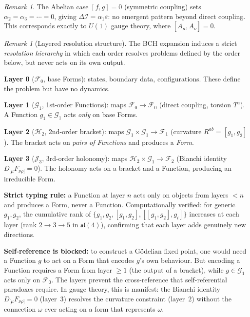 \documentclass[11pt,a4paper]{article}
\theoremstyle{plain}
\theoremstyle{definition}
\theoremstyle{remark}
\newtheorem{remark}[theorem]{Remark}
\newcommand{\DI}{\Delta\mathcal{I}}
\newcommand{\eps}{\varepsilon}
\begin{document}
\begin{remark}
The Abelian case $[f,g] = 0$ (symmetric coupling) sets $\alpha_2 = \alpha_3 = \cdots = 0$, 
giving $\DI = \alpha_1 \eps$: no emergent pattern beyond direct coupling.
This corresponds exactly to $U(1)$ gauge theory, where $[A_\mu, A_\nu] = 0$.
\end{remark}

\begin{remark}[Layered resolution structure]\label{rem:layers}
The BCH expansion induces a strict \emph{resolution hierarchy} in which each
order resolves problems defined by the order below, but never acts on its
own output.

\medskip
\noindent\textbf{Layer 0} ($\mathcal{F}_0$, base Forms): states, boundary
data, configurations.  These define the problem but have no dynamics.

\noindent\textbf{Layer 1} ($\mathcal{G}_1$, 1st-order Functions):
maps $\mathcal{F}_0 \to \mathcal{F}_0$ (direct coupling, torsion $T^a$).
A Function $g_1 \in \mathcal{G}_1$ acts \emph{only} on base Forms.

\noindent\textbf{Layer 2} ($\mathcal{H}_2$, 2nd-order bracket):
maps $\mathcal{G}_1 \times \mathcal{G}_1 \to \mathcal{F}_1$
(curvature $R^{ab} = [g_1, g_2]$).
The bracket acts on \emph{pairs of Functions} and produces a \emph{Form}.

\noindent\textbf{Layer 3} ($\mathcal{J}_3$, 3rd-order holonomy):
maps $\mathcal{H}_2 \times \mathcal{G}_1 \to \mathcal{F}_2$
(Bianchi identity $D_{[\mu}F_{\nu\rho]} = 0$).
The holonomy acts on a bracket and a Function, producing an
irreducible Form.

\medskip
\noindent\textbf{Strict typing rule:} a Function at layer $n$ acts
only on objects from layers $< n$ and produces a Form, never a Function.
Computationally verified: for generic $g_1, g_2$, the cumulative rank
of $\{g_1, g_2, [g_1,g_2], [[g_1,g_2],g_i]\}$ increases at each layer
(rank $2 \to 3 \to 5$ in $\mathfrak{sl}(4)$), confirming that each
layer adds genuinely new directions.

\medskip
\noindent\textbf{Self-reference is blocked:}
to construct a G\"{o}delian fixed point, one would need a Function
$g$ to act on a Form that encodes $g$'s own behaviour.
But encoding a Function requires a Form from layer $\geq 1$
(the output of a bracket), while $g \in \mathcal{G}_1$ acts only on
$\mathcal{F}_0$.  The layers prevent the cross-reference that
self-referential paradoxes require.  In gauge theory, this is
manifest: the Bianchi identity $D_{[\mu}F_{\nu\rho]} = 0$
(layer~3) resolves the curvature constraint (layer~2) without
the connection $\omega$ ever acting on a form that represents $\omega$.
\end{remark}
\end{document}
